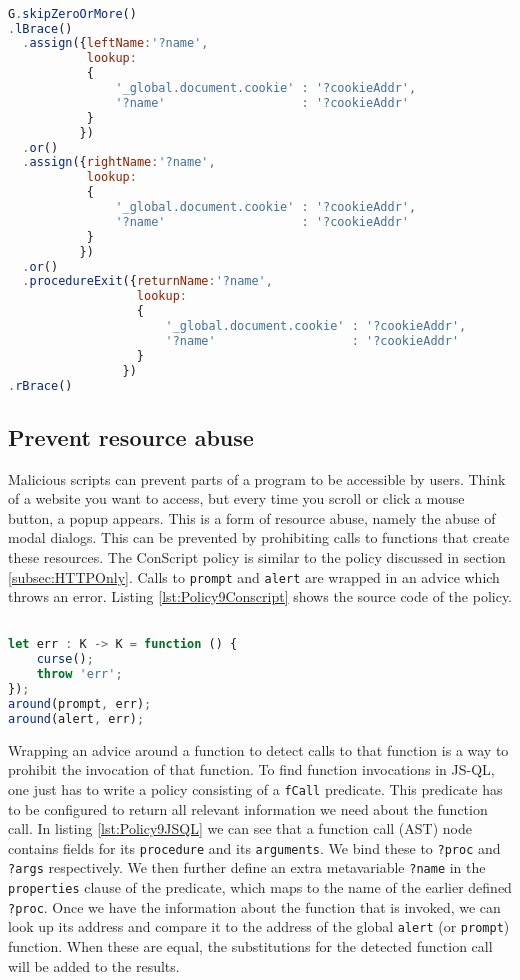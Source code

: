 \begin{lstlisting}[label={lst:Policy8JSQL},language=JavaScript,caption=Policy 8 in JS-QL,mathescape=true]  % float=t?

G.skipZeroOrMore()
.lBrace()
  .assign({leftName:'?name',
           lookup:
           {
               '_global.document.cookie' : '?cookieAddr',
               '?name'                   : '?cookieAddr' 
           }
          })
  .or()
  .assign({rightName:'?name',
           lookup:
           {
               '_global.document.cookie' : '?cookieAddr',
               '?name'                   : '?cookieAddr' 
           }
          })
  .or()
  .procedureExit({returnName:'?name',
                  lookup:
                  {
                      '_global.document.cookie' : '?cookieAddr',
                      '?name'                   : '?cookieAddr'  
                  }
                })
.rBrace()
\end{lstlisting}

\subsection{Prevent resource abuse}

Malicious scripts can prevent parts of a program to be accessible by users. Think of a website you want to access, but every time you scroll or click a mouse button, a popup appears. This is a form of resource abuse, namely the abuse of modal dialogs. This can be prevented by prohibiting calls to functions that create these resources. The ConScript policy is similar to the policy discussed in section \ref{subsec:HTTPOnly}. Calls to \texttt{prompt} and \texttt{alert} are wrapped in an advice which throws an error. Listing \ref{lst:Policy9Conscript} shows the source code of the policy.

\begin{lstlisting}[label={lst:Policy9Conscript},language=JavaScript,caption=Policy 9 in ConScript,mathescape=true]  % float=t?

let err : K -> K = function () { 
    curse(); 
    throw 'err'; 
}); 
around(prompt, err); 
around(alert, err);
\end{lstlisting}

Wrapping an advice around a function to detect calls to that function is a way to prohibit the invocation of that function. To find function invocations in JS-QL, one just has to write a policy consisting of a \texttt{fCall} predicate. This predicate has to be configured to return all relevant information we need about the function call. In listing \ref{lst:Policy9JSQL} we can see that a function call (AST) node contains fields for its \texttt{procedure} and its \texttt{arguments}. We bind these to \texttt{?proc} and \texttt{?args} respectively. We then further define an extra metavariable \texttt{?name} in the \texttt{properties} clause of the predicate, which maps to the name of the earlier defined \texttt{?proc}. Once we have the information about the function that is invoked, we can look up its address and compare it to the address of the global \texttt{alert} (or \texttt{prompt}) function. When these are equal, the substitutions for the detected function call will be added to the results.

